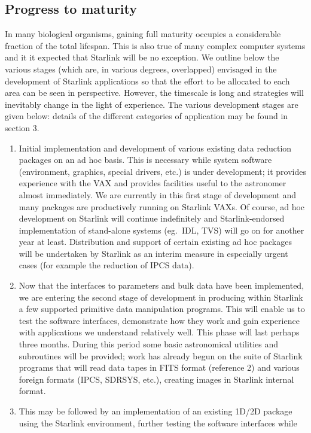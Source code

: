 \subsection {Progress to maturity}
In many biological organisms, gaining full maturity occupies a considerable
fraction of the total lifespan.
This is also true of many complex computer systems and it it expected that
Starlink will be no exception.
We outline below the various stages (which are, in various degrees, overlapped) 
envisaged in the development of Starlink applications so that the effort to be
allocated to each area can be seen in perspective.
However, the timescale is long and strategies will inevitably change in the
light of experience.
The various development stages are given below: details of the different
categories of application may be found in section 3.
\begin{enumerate}
\item Initial implementation and development of various existing data reduction
packages on an ad hoc basis.
This is necessary while system software (environment, graphics, special drivers,
etc.) is under development; it provides experience with the VAX and provides
facilities useful to the astronomer almost immediately.
We are currently in this first stage of development and many packages are
productively running on Starlink VAXs.
Of course, ad hoc development on Starlink will continue indefinitely and
Starlink-endorsed implementation of stand-alone systems (eg.\ IDL, TVS) will go
on for another year at least.
Distribution and support of certain existing ad hoc packages will be undertaken
by Starlink as an interim measure in especially urgent cases (for example the
reduction of IPCS data).
\item Now that the interfaces to parameters and bulk data have been implemented,
we are entering the second stage of development in producing within Starlink a
few supported primitive data manipulation programs.
This will enable us to test the software interfaces, demonstrate how they work
and gain experience with applications we understand relatively well.
This phase will last perhaps three months.
During this period some basic astronomical utilities and subroutines will be
provided; work has already begun on the suite of Starlink programs that will
read data tapes in FITS format (reference 2) and various foreign formats
(IPCS, SDRSYS, etc.), creating images in Starlink internal format.
\item This may be followed by an implementation of an existing 1D/2D package
using the Starlink environment, further testing the software interfaces while

\end{enumerate}
